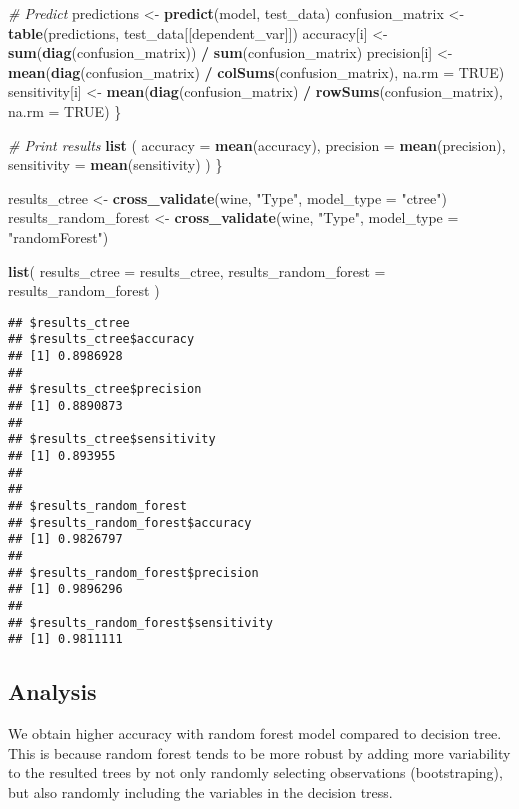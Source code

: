 \documentclass[
]{article}
\newenvironment{Shaded}{\begin{snugshade}}{\end{snugshade}}
\newcommand{\AttributeTok}[1]{\textcolor[rgb]{0.13,0.29,0.53}{#1}}
\newcommand{\CommentTok}[1]{\textcolor[rgb]{0.56,0.35,0.01}{\textit{#1}}}
\newcommand{\ConstantTok}[1]{\textcolor[rgb]{0.56,0.35,0.01}{#1}}
\newcommand{\FunctionTok}[1]{\textcolor[rgb]{0.13,0.29,0.53}{\textbf{#1}}}
\newcommand{\NormalTok}[1]{#1}
\newcommand{\OtherTok}[1]{\textcolor[rgb]{0.56,0.35,0.01}{#1}}
\newcommand{\SpecialCharTok}[1]{\textcolor[rgb]{0.81,0.36,0.00}{\textbf{#1}}}
\newcommand{\StringTok}[1]{\textcolor[rgb]{0.31,0.60,0.02}{#1}}
\begin{document}
\begin{Shaded}
\begin{Highlighting}[]
    \CommentTok{\# Predict}
\NormalTok{    predictions }\OtherTok{\textless{}{-}} \FunctionTok{predict}\NormalTok{(model, test\_data)}
\NormalTok{    confusion\_matrix }\OtherTok{\textless{}{-}} \FunctionTok{table}\NormalTok{(predictions, test\_data[[dependent\_var]])}
\NormalTok{    accuracy[i] }\OtherTok{\textless{}{-}} \FunctionTok{sum}\NormalTok{(}\FunctionTok{diag}\NormalTok{(confusion\_matrix)) }\SpecialCharTok{/} \FunctionTok{sum}\NormalTok{(confusion\_matrix)}
\NormalTok{    precision[i] }\OtherTok{\textless{}{-}} \FunctionTok{mean}\NormalTok{(}\FunctionTok{diag}\NormalTok{(confusion\_matrix) }\SpecialCharTok{/} \FunctionTok{colSums}\NormalTok{(confusion\_matrix), }\AttributeTok{na.rm =} \ConstantTok{TRUE}\NormalTok{)}
\NormalTok{    sensitivity[i] }\OtherTok{\textless{}{-}} \FunctionTok{mean}\NormalTok{(}\FunctionTok{diag}\NormalTok{(confusion\_matrix) }\SpecialCharTok{/} \FunctionTok{rowSums}\NormalTok{(confusion\_matrix), }\AttributeTok{na.rm =} \ConstantTok{TRUE}\NormalTok{)}
\NormalTok{  \}}

  \CommentTok{\# Print results}
  \FunctionTok{list}\NormalTok{ (}
    \AttributeTok{accuracy =} \FunctionTok{mean}\NormalTok{(accuracy),}
    \AttributeTok{precision =} \FunctionTok{mean}\NormalTok{(precision),}
    \AttributeTok{sensitivity =} \FunctionTok{mean}\NormalTok{(sensitivity)}
\NormalTok{  )}
\NormalTok{\}}

\NormalTok{results\_ctree }\OtherTok{\textless{}{-}} \FunctionTok{cross\_validate}\NormalTok{(wine, }\StringTok{"Type"}\NormalTok{, }\AttributeTok{model\_type =} \StringTok{"ctree"}\NormalTok{)}
\NormalTok{results\_random\_forest }\OtherTok{\textless{}{-}} \FunctionTok{cross\_validate}\NormalTok{(wine, }\StringTok{"Type"}\NormalTok{, }\AttributeTok{model\_type =} \StringTok{"randomForest"}\NormalTok{)}

\FunctionTok{list}\NormalTok{(}
  \AttributeTok{results\_ctree =}\NormalTok{ results\_ctree,}
  \AttributeTok{results\_random\_forest =}\NormalTok{ results\_random\_forest}
\NormalTok{)}
\end{Highlighting}
\end{Shaded}

\begin{verbatim}
## $results_ctree
## $results_ctree$accuracy
## [1] 0.8986928
## 
## $results_ctree$precision
## [1] 0.8890873
## 
## $results_ctree$sensitivity
## [1] 0.893955
## 
## 
## $results_random_forest
## $results_random_forest$accuracy
## [1] 0.9826797
## 
## $results_random_forest$precision
## [1] 0.9896296
## 
## $results_random_forest$sensitivity
## [1] 0.9811111
\end{verbatim}

\subsection{Analysis}\label{analysis}

We obtain higher accuracy with random forest model compared to decision
tree. This is because random forest tends to be more robust by adding
more variability to the resulted trees by not only randomly selecting
observations (bootstraping), but also randomly including the variables
in the decision tress.
\end{document}
